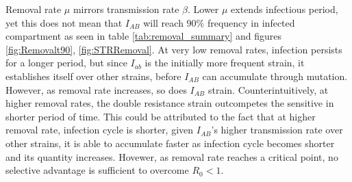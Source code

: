 \documentclass{report}
\begin{document}
Removal rate $\mu$ mirrors transmission rate $\beta$. Lower $\mu$ extends infectious period, yet this does not mean that $I_{AB}$ will reach $90\%$ frequency in infected compartment as seen in table \ref{tab:removal_summary} and figures \ref{fig:Removalt90}, \ref{fig:STRRemoval}. At very low removal rates, infection persists for a longer period, but since $I_{ab}$ is the initially more frequent strain, it establishes itself over other strains, before $I_{AB}$ can accumulate through mutation. However, as removal rate increases, so does $I_{AB}$ strain. Counterintuitively, at higher removal rates, the double resistance strain outcompetes the sensitive in shorter period of time. This could be attributed to the fact that at higher removal rate, infection cycle is shorter, given $I_{AB}$'s higher transmission rate over other strains, it is able to accumulate faster as infection cycle becomes shorter and its quantity increases.
Hovewer, as removal rate reaches a critical point, no selective advantage is sufficient to overcome $R_{0} <1$. 
\end{document}
